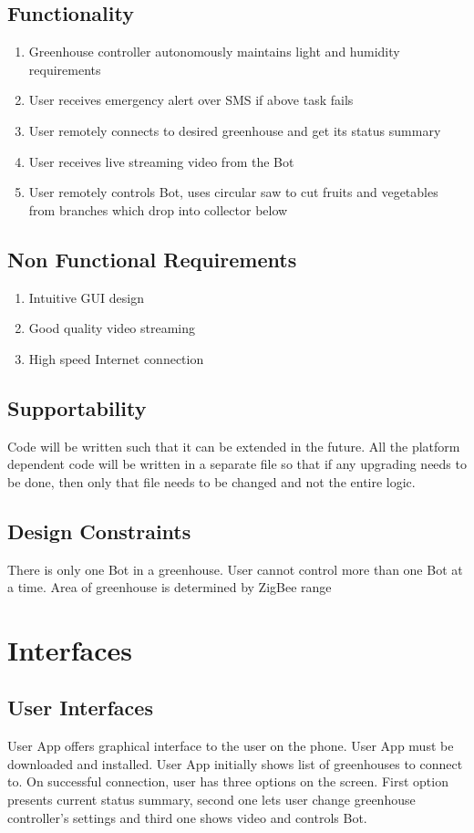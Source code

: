 \documentclass[a4paper, 12pt]{article}
\begin{document}
\subsection{Functionality}
\begin{enumerate}
 \item Greenhouse controller autonomously maintains light and humidity requirements
 \item User receives emergency alert over SMS if above task fails
 \item User remotely connects to desired greenhouse and get its status summary
 \item User receives live streaming video from the Bot
 \item User remotely controls Bot, uses circular saw to cut fruits and vegetables from branches 
 which drop into collector below
\end{enumerate}

\subsection{Non Functional Requirements}
\begin{enumerate}
 \item Intuitive GUI design
 \item Good quality video streaming
 \item High speed Internet connection
\end{enumerate}


\subsection{Supportability}
Code will be written such that it can be extended in the future.
All the platform dependent code will be written in a separate file so that if any upgrading needs to be done, 
then only that file needs to be changed and not the entire logic.


\subsection{Design Constraints}
There is only one Bot in a greenhouse. User cannot control more than one Bot at a time.
Area of greenhouse is determined by ZigBee range

\section{Interfaces}
\subsection{User Interfaces}
User App offers graphical interface to the user on the phone. User App must be downloaded and installed.
User App initially shows list of greenhouses to connect to. On successful connection, user has three options
on the screen. First option presents current status summary, second one lets user change greenhouse controller's settings
and third one shows video and controls Bot.
\end{document}
